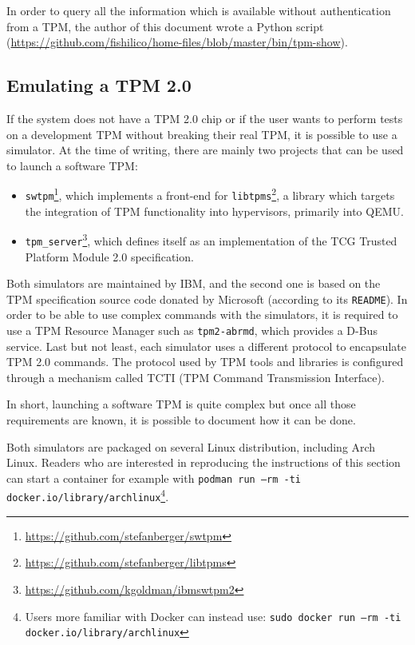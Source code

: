 In order to query all the information which is available without
authentication from a TPM, the author of this document wrote a Python
script
(\url{https://github.com/fishilico/home-files/blob/master/bin/tpm-show}).

\subsection{Emulating a TPM 2.0}

If the system does not have a TPM 2.0 chip or if the user wants to
perform tests on a development TPM without breaking their real TPM, it
is possible to use a simulator. At the time of writing, there are mainly
two projects that can be used to launch a software TPM:

\begin{itemize}

\item
  \texttt{swtpm}\footnote{\url{https://github.com/stefanberger/swtpm}},
  which implements a front-end for
  \texttt{libtpms}\footnote{\url{https://github.com/stefanberger/libtpms}},
  a library which targets the integration of TPM functionality into
  hypervisors, primarily into QEMU.
\item
  \texttt{tpm\_server}\footnote{\url{https://github.com/kgoldman/ibmswtpm2}},
  which defines itself as an implementation of the TCG Trusted Platform
  Module 2.0 specification.
\end{itemize}

Both simulators are maintained by IBM, and the second one is based on
the TPM specification source code donated by Microsoft (according to its
\texttt{README}). In order to be able to use complex
commands with the simulators, it is required to use a TPM Resource
Manager such as \texttt{tpm2-abrmd}, which provides a
D-Bus service. Last but not least, each simulator uses a different
protocol to encapsulate TPM 2.0 commands. The protocol used by TPM tools
and libraries is configured through a mechanism called TCTI (TPM Command
Transmission Interface).

In short, launching a software TPM is quite complex but once all those
requirements are known, it is possible to document how it can be done.

Both simulators are packaged on several Linux distribution, including
Arch Linux. Readers who are interested in reproducing the instructions
of this section can start a container for example with
\texttt{podman run --rm -ti docker.io/library/archlinux}\footnote{Users
  more familiar with Docker can instead use:
  \texttt{sudo docker run --rm -ti docker.io/library/archlinux}}.

